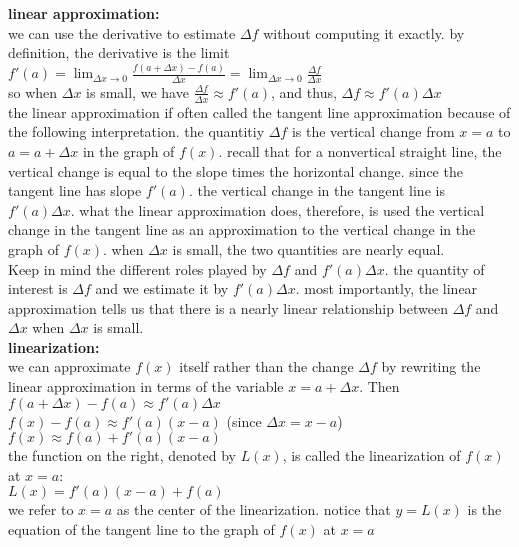 \documentclass{article}
\begin{document}
\textbf{linear approximation:}\\
we can use the derivative to estimate $\Delta f$ without computing it exactly. by definition, the derivative is the limit\\ $f'(a) = \lim_{\Delta x \to 0}\frac{f(a + \Delta x) - f(a)}{\Delta x} = \lim_{\Delta x \to 0}\frac{\Delta f}{\Delta x}$\\ so when $\Delta x$ is small, we have $\frac{\Delta f}{\Delta x} \approx f'(a)$, and thus, $\Delta f \approx f'(a)\Delta x$\\

the linear approximation if often called the tangent line approximation because of the following interpretation. the quantitiy $\Delta f$ is the vertical change from $x = a$ to $a = a + \Delta x$ in the graph of $f(x)$. recall that for a nonvertical straight line, the vertical change is equal to the slope times the horizontal change. since the tangent line has slope $f'(a)$. the vertical change in the tangent line is $f'(a)\Delta x$. what the linear approximation does, therefore, is used the vertical change in the tangent line as an approximation to the vertical change in the graph of $f(x)$. when $\Delta x$ is small, the two quantities are nearly equal.\\

Keep in mind the different roles played by $\Delta f$ and $f'(a)\Delta x$. the quantity of interest is $\Delta f$ and we estimate it by $f'(a)\Delta x$. most importantly, the linear approximation tells us that there is a nearly linear relationship between $\Delta f$ and $\Delta x$ when $\Delta x$ is small.\\

\textbf{linearization:}\\
we can approximate $f(x)$ itself rather than the change $\Delta f$ by rewriting the linear approximation in terms of the variable $x = a + \Delta x$. Then\\ $f(a + \Delta x) - f(a) \approx f'(a)\Delta x$\\ $f(x) - f(a) \approx f'(a)(x - a)$ (since $\Delta x = x - a$)\\ $f(x) \approx f(a) + f'(a)(x - a)$\\ the function on the right, denoted by $L(x)$, is called the linearization of $f(x)$ at $x = a$:\\ $L(x) = f'(a)(x - a) + f(a)$\\ we refer to $x = a$ as the center of the linearization. notice that $y = L(x)$ is the equation of the tangent line to the graph of $f(x)$ at $x = a$\\
\end{document}
